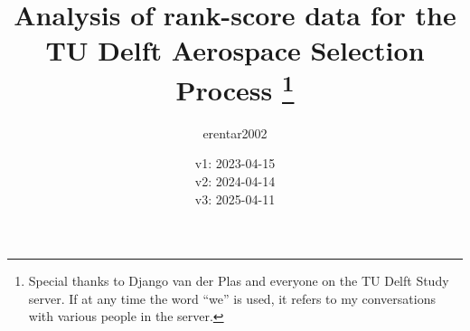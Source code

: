 \title{
    Analysis of rank-score data for the TU Delft Aerospace Selection Process
    \thanks{
        Special thanks to Django van der Plas and everyone on the TU Delft Study server. If at any time the word ``we'' is used, it refers to my conversations with various people in the server.
    }
}
\author{erentar2002}
\date{v1: 2023-04-15\\ v2: 2024-04-14\\ v3: 2025-04-11}